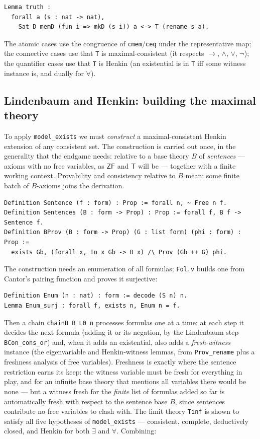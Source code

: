 \documentclass[11pt]{article}
\theoremstyle{plain}
\theoremstyle{definition}
\newcommand{\ZF}{\mathsf{ZF}}
\renewcommand{\ZF}{\textsf{ZF}}
\newcommand{\T}{\textsf{T}}
\newcommand{\cq}[1]{\lstinline[basicstyle=\ttfamily]|#1|}
\begin{document}
\begin{lstlisting}
Lemma truth :
  forall a (s : nat -> nat),
    Sat D memD (fun i => mkD (s i)) a <-> T (rename s a).
\end{lstlisting}

The atomic cases use the congruence of \cq{cmem}/\cq{ceq} under the
representative map; the connective cases use that \cq{T} is maximal-consistent
(it respects $\to$, $\wedge$, $\vee$, $\neg$); the quantifier cases use that \cq{T}
is Henkin (an existential is in \cq{T} iff some witness instance is, and dually for
$\forall$).

\subsection{Lindenbaum and Henkin: building the maximal theory}

To apply \cq{model_exists} we must \emph{construct} a maximal-consistent Henkin
extension of any consistent set. The construction is carried out once, in the
generality that the endgame needs: relative to a base theory $B$ of
\emph{sentences} --- axioms with no free variables, as $\ZF$ and $\T$ will be ---
together with a finite working context. Provability and consistency relative to
$B$ mean: some finite batch of $B$-axioms joins the derivation.

\begin{lstlisting}
Definition Sentence (f : form) : Prop := forall n, ~ Free n f.
Definition Sentences (B : form -> Prop) : Prop := forall f, B f -> Sentence f.
Definition BProv (B : form -> Prop) (G : list form) (phi : form) : Prop :=
  exists Gb, (forall x, In x Gb -> B x) /\ Prov (Gb ++ G) phi.
\end{lstlisting}

The construction needs an enumeration of all formulas; \texttt{Fol.v} builds one
from Cantor's pairing function and proves it surjective:

\begin{lstlisting}
Definition Enum (n : nat) : form := decode (S n) n.
Lemma Enum_surj : forall f, exists n, Enum n = f.
\end{lstlisting}

Then a chain \cq{chainB B L0 n} processes formulas one at a time: at each step it
decides the next formula (adding it or its negation, by the Lindenbaum step
\cq{BCon_cons_or}) and, when it adds an existential, also adds a
\emph{fresh-witness} instance (the eigenvariable
and Henkin-witness lemmas, from \cq{Prov_rename} plus a freshness analysis of free
variables). Freshness is exactly where the sentence restriction earns its keep:
the witness variable must be fresh for everything in play, and for an infinite
base theory that mentions all variables there would be none --- but a witness
fresh for the \emph{finite} list of formulas added so far is automatically fresh
with respect to the sentence base $B$, since sentences contribute no free
variables to clash with. The limit theory \cq{Tinf} is shown to satisfy all five
hypotheses of \cq{model_exists} --- consistent, complete, deductively closed, and
Henkin for both $\exists$ and $\forall$. Combining:
\end{document}
